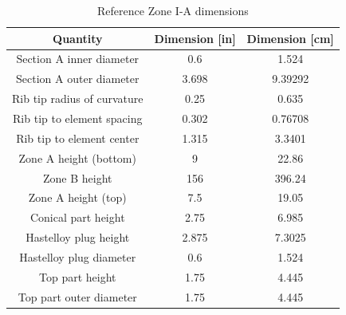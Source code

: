 \begin{table}[htpb]
    \centering
    \caption{Reference Zone I-A dimensions}
    \label{tab:zone-ia-ref-specs}
    \begin{tabulary}{\linewidth}{|C|C|C|}
    \hline
    Quantity & Dimension [in] & Dimension [\unit{\centi\metre}]\\
    \hline
    Section A inner diameter & 0.6 & 1.524 \\
    \hline
    Section A outer diameter & 3.698 & 9.39292 \\
    \hline
    Rib tip radius of curvature & 0.25 & 0.635 \\
    \hline
    Rib tip to element spacing & 0.302 & 0.76708 \\
    \hline
    Rib tip to element center & 1.315 & 3.3401 \\
    \hline
    Zone A height (bottom) & 9 & 22.86\\
    \hline
    Zone B height & 156 & 396.24 \\
    \hline
    Zone A height (top) & 7.5 & 19.05 \\
    \hline
    Conical part height & 2.75 & 6.985 \\
    \hline
    Hastelloy plug height & 2.875 & 7.3025 \\
    \hline
    Hastelloy plug diameter & 0.6 & 1.524 \\
    \hline
    Top part height & 1.75 & 4.445 \\
    \hline
    Top part outer diameter & 1.75 & 4.445 \\
    \hline
    \end{tabulary}
\end{table}



